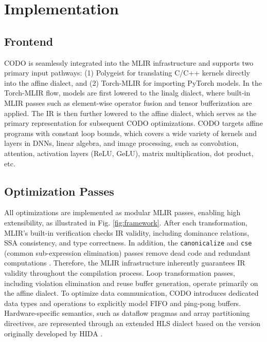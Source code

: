 \documentclass[conference]{IEEEtran}
\begin{document}


\section{Implementation}
\subsection{Frontend}
CODO is seamlessly integrated into the MLIR infrastructure and supports two primary input pathways: (1) Polygeist \cite{polygeistPACT} for translating C/C++ kernels directly into the affine dialect, and (2) Torch-MLIR \cite{torchmlir} for importing PyTorch models. In the Torch-MLIR flow, models are first lowered to the linalg dialect, where built-in MLIR passes such as element-wise operator fusion and tensor bufferization are applied. The IR is then further lowered to the affine dialect, which serves as the primary representation for subsequent CODO optimizations. CODO targets affine programs with constant loop bounds, which covers a wide variety of kernels and layers in DNNs, linear algebra, and image processing, such as convolution, attention, activation layers (ReLU, GeLU), matrix multiplication, dot product, etc.

\subsection{Optimization Passes}
All optimizations are implemented as modular MLIR passes, enabling high extensibility, as illustrated in Fig. \ref{fig:framework}. After each transformation, MLIR’s built-in verification checks IR validity, including dominance relations, SSA consistency, and type correctness.   In addition, the \texttt{canonicalize} and \texttt{cse} (common sub-expression elimination) passes remove dead code and redundant computations \cite{mlir2025}. Therefore, the MLIR infrastructure inherently guarantees IR validity throughout the compilation process.
Loop transformation passes, including violation elimination and reuse buffer generation, operate primarily on the affine dialect. To optimize data communication, CODO introduces dedicated data types and operations to explicitly model FIFO and ping-pong buffers. Hardware-specific semantics, such as dataflow pragmas and array partitioning directives, are represented through an extended HLS dialect based on the version originally developed by HIDA \cite{ye2024hida}.
\end{document}
